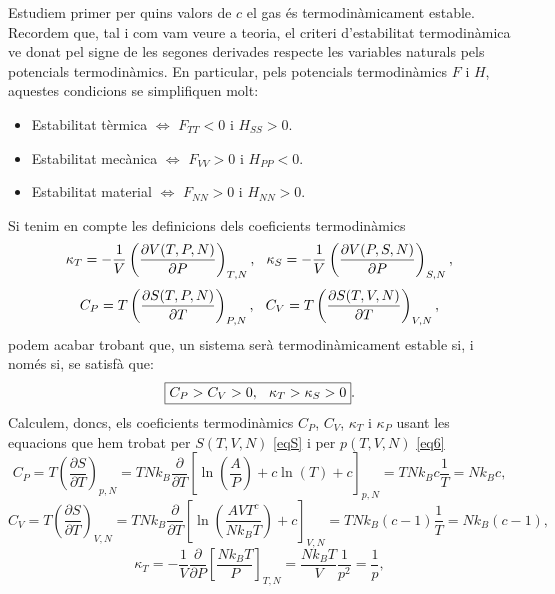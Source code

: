 \documentclass[a4paper, 10pt]{article}
\begin{document}
Estudiem primer per quins valors de $c$ el gas és termodinàmicament estable. Recordem que, tal i com vam veure a teoria, el criteri d'estabilitat termodinàmica ve donat pel signe de les segones derivades respecte les variables naturals pels potencials termodinàmics. En particular, pels potencials termodinàmics $F$ i $H$, aquestes condicions se simplifiquen molt:
\begin{itemize}
	\item Estabilitat tèrmica $\Leftrightarrow$ $F_{TT}<0$ i $H_{SS}>0$.
	\item Estabilitat mecànica $\Leftrightarrow$ $F_{VV}>0$ i $H_{PP}<0$.
	\item Estabilitat material $\Leftrightarrow$ $F_{NN}>0$ i $H_{NN}>0$.
\end{itemize}
Si tenim en compte les definicions dels coeficients termodinàmics
\begin{equation}
	\kappa_{T} = -\frac{1}{V}\left(\frac{\partial V(T,P,N)}{\partial P}\right)_{T,N}, \hspace{0.25cm}\kappa_{S} = -\frac{1}{V}\left(\frac{\partial V(P,S,N)}{\partial P}\right)_{S,N}, 
\end{equation}
\begin{equation}
	C_{P} = T\left(\frac{\partial S(T,P,N)}{\partial T}\right)_{P,N}, \hspace{0.25cm} C_{V} = T\left(\frac{\partial S(T,V,N)}{\partial T}\right)_{V,N},
\end{equation}
podem acabar trobant que, un sistema serà termodinàmicament estable si, i només si, se satisfà que:
\begin{equation}
	\boxed{C_P>C_V>0, \hspace{0.25cm} \kappa_T > \kappa_S >0}.
\end{equation}
Calculem, doncs, els coeficients termodinàmics $C_P$, $C_V$, $\kappa_T$ i $\kappa_P$ usant les equacions que hem trobat per $S(T,V,N)$ \eqref{eqS} i per $p(T,V,N)$ \eqref{eq6} 
\begin{equation*}
	C_P = T\left(\frac{\partial S}{\partial T}\right)_{p,N} = TNk_B\frac{\partial}{\partial T}\left[\ln(\frac{A}{P})+c\ln(T)+c\right]_{p,N} = TNk_Bc\frac{1}{T} = Nk_Bc,
\end{equation*}
\begin{equation*}
	C_V = T\left(\frac{\partial S}{\partial T}\right)_{V,N} = TNk_B\frac{\partial}{\partial T}\left[\ln\left(\frac{AVT^c}{Nk_BT}\right)+c\right]_{V,N} = TNk_B(c-1)\frac{1}{T} = Nk_B(c-1),
\end{equation*}
\begin{equation*}
	\kappa_T = -\frac{1}{V}\frac{\partial}{\partial P}\left[\frac{Nk_BT}{P}\right]_{T,N} = \frac{Nk_BT}{V}\frac{1}{p^2}=\frac{1}{p},
\end{equation*}
\end{document}
